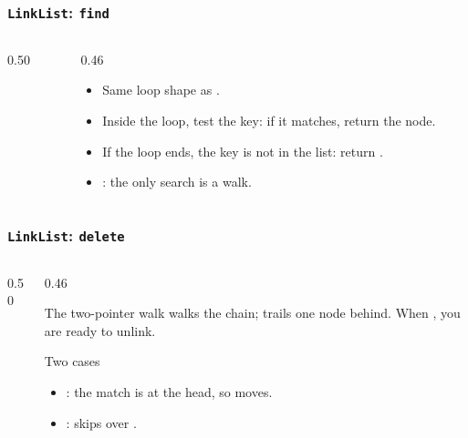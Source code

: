 \documentclass[aspectratio=169,10pt,compress]{beamer}
\begin{document}
\begin{frame}[t,fragile] \frametitle{\texttt{LinkList}: \texttt{find}}
  \begin{columns}[T]
    \begin{column}{0.50\textwidth}
    \end{column}
    \begin{column}{0.46\textwidth}
      \begin{itemize}\small
        \item Same loop shape as .
        \item Inside the loop, test the key: if it matches, return the node.
        \item If the loop ends, the key is not in the list: return .
        \item {}: the only search is a walk.
      \end{itemize}
    \end{column}
  \end{columns}
\end{frame}




\begin{frame}[t,fragile] \frametitle{\texttt{LinkList}: \texttt{delete}}
  \begin{columns}[T]
    \begin{column}{0.50\textwidth}
    \end{column}
    \begin{column}{0.46\textwidth}
      \begin{block}{The two-pointer walk}
        \small
         walks the chain;  trails one
        node behind. When , you are ready
        to unlink.
      \end{block}
      \begin{block}{Two cases}
        \small
        \begin{itemize}
          \item {}: the match is at the head, so
                 moves.
          \item {}:  skips
                over .
        \end{itemize}
      \end{block}
    \end{column}
  \end{columns}
\end{frame}
\end{document}
